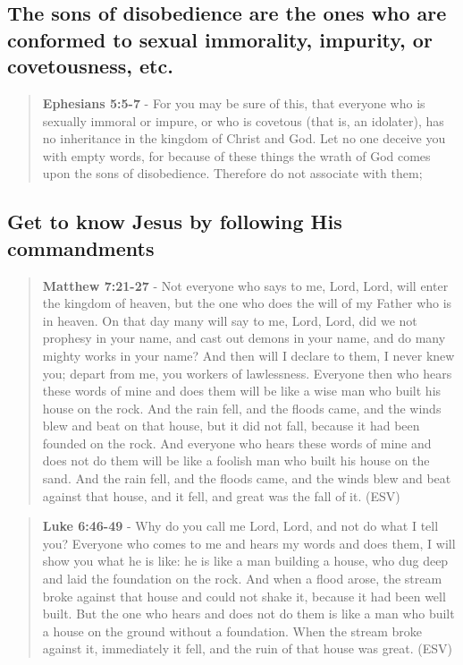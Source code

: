 \documentclass[11pt]{article}
\begin{document}
\subsection{The sons of disobedience are the ones who are conformed to sexual immorality, impurity, or covetousness, etc.}
\label{sec:org4b0bb59}
\begin{quote}
\textbf{Ephesians 5:5-7} - For you may be sure of this, that everyone who is sexually immoral or impure, or who is covetous (that is, an idolater), has no inheritance in the kingdom of Christ and God. Let no one deceive you with empty words, for because of these things the wrath of God comes upon the sons of disobedience. Therefore do not associate with them;
\end{quote}

\subsection{Get to know Jesus by following His commandments}
\label{sec:org73e887c}
\begin{quote}
\textbf{Matthew 7:21-27} - Not everyone who says to me, Lord, Lord, will enter the kingdom of heaven, but the one who does the will of my Father who is in heaven.  On that day many will say to me, Lord, Lord, did we not prophesy in your name, and cast out demons in your name, and do many mighty works in your name?  And then will I declare to them, I never knew you; depart from me, you workers of lawlessness.  Everyone then who hears these words of mine and does them will be like a wise man who built his house on the rock.  And the rain fell, and the floods came, and the winds blew and beat on that house, but it did not fall, because it had been founded on the rock.  And everyone who hears these words of mine and does not do them will be like a foolish man who built his house on the sand.  And the rain fell, and the floods came, and the winds blew and beat against that house, and it fell, and great was the fall of it. (ESV)
\end{quote}

\begin{quote}
\textbf{Luke 6:46-49} - Why do you call me Lord, Lord, and not do what I tell you? Everyone who comes to me and hears my words and does them, I will show you what he is like: he is like a man building a house, who dug deep and laid the foundation on the rock. And when a flood arose, the stream broke against that house and could not shake it, because it had been well built. But the one who hears and does not do them is like a man who built a house on the ground without a foundation. When the stream broke against it, immediately it fell, and the ruin of that house was great. (ESV)
\end{quote}
\end{document}
